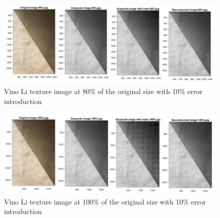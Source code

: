 \begin{figure}[!ht]
\center \includegraphics[scale=0.31]{VinoLi80.jpg}
\caption{Vino Li texture image at 80\% of the original size with 10\% error introduction}
\label{fig:VinoLi80}
\end{figure}

\begin{figure}[!ht]
\center \includegraphics[scale=0.31]{VinoLi100.jpg}
\caption{Vino Li texture image at 100\% of the original size with 10\% error introduction}
\label{fig:VinoLi100}
\end{figure}


